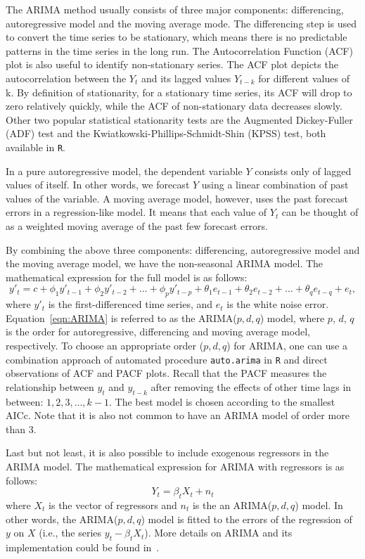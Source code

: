\documentclass [11pt, proquest] {uwthesis}[2015/03/03]
\begin{document}
The ARIMA method usually consists of three major components: differencing, autoregressive model and the moving average mode. The differencing step is used to convert the time series to be stationary, which means there is no predictable patterns in the time series in the long run. The Autocorrelation Function (ACF) plot is also useful to identify non-stationary series. The ACF plot depicts the autocorrelation between the $Y_t$ and its lagged values $Y_{t-k}$ for different values of k. By definition of stationarity, for a stationary time series, its ACF will drop to zero relatively quickly, while the ACF of non-stationary data decreases slowly. Other two popular statistical stationarity tests are the Augmented Dickey-Fuller (ADF) test and the Kwiatkowski-Phillips-Schmidt-Shin (KPSS) test, both available in \texttt{R}.

In a pure autoregressive model, the dependent variable $Y$ consists only of lagged values of itself. In other words, we forecast $Y$ using a linear combination of past values of the variable. A moving average model, however, uses the past forecast errors in a regression-like model. It means that each value of $Y_t$ can be thought of as a weighted moving average of the past few forecast errors. 

By combining the above three components: differencing, autoregressive model and the moving average model, we have the non-seasonal ARIMA model. The mathematical expression for the full model is as follows:
\begin{equation}
y'_t = c + \phi_1 y'_{t-1} + \phi_2 y'_{t-2} + \hdots + \phi_p y'_{t-p} + \theta_1 e_{t-1} + \theta_2 e_{t-2} + \hdots + \theta_q e_{t-q} + e_t, \label{eqn:ARIMA}
\end{equation}
where $y'_t$ is the first-differenced time series, and $e_t$ is the white noise error. Equation~\eqref{eqn:ARIMA} is referred to as the ARIMA($p,d,q$) model, where $p$, $d$, $q$ is the order for autoregressive, differencing and moving average model, respectively. To choose an appropriate order ($p,d,q$) for ARIMA, one can use a combination approach of automated procedure \texttt{auto.arima} in \texttt{R} and direct observations of ACF and PACF plots. Recall that the PACF measures the relationship between $y_t$ and $y_{t-k}$ after removing the effects of other time lags in between: $1, 2, 3, \hdots, k-1$. The best model is chosen according to the smallest AICc. Note that it is also not common to have an ARIMA model of order more than 3.

Last but not least, it is also possible to include exogenous regressors in the ARIMA model. The mathematical expression for ARIMA with regressors is as follows:
\[Y_t = \beta_t X_t + n_t\]
where $X_t$ is the vector of regressors and $n_t$ is the an ARIMA($p,d,q$) model. In other words, the ARIMA($p,d,q$) model is fitted to the errors of the regression of $y$ on $X$ (i.e., the series $y_t - \beta_t X_t$). More details on ARIMA and its implementation could be found in~\cite{Hall11}.
\end{document}
